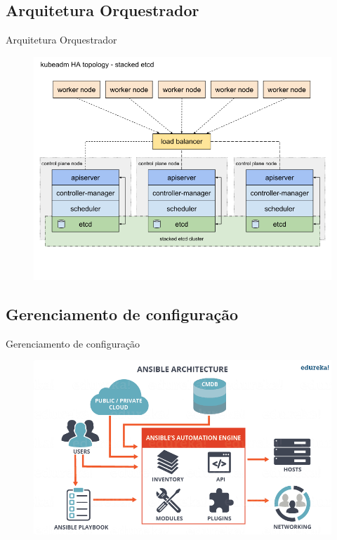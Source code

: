 \documentclass[10pt,brazil]{beamer}
\theoremstyle{definition}
\begin{document}
\subsection{Arquitetura Orquestrador}

\begin{frame}{Arquitetura Orquestrador}
\begin{figure}
    \centering
    \includegraphics[width=1\textwidth]{kubeadm-ha-topology-stacked-etcd.png}
    \label{fig:k8s-arch}
\end{figure}
\end{frame}

\subsection{Gerenciamento de configuração}

\begin{frame}{Gerenciamento de configuração}
      \begin{figure}
          \centering
      \includegraphics[width=.8\textwidth]{ansible arch.png}
          \label{fig:ansiblearch}
      \end{figure}
      
\end{frame}
\end{document}
